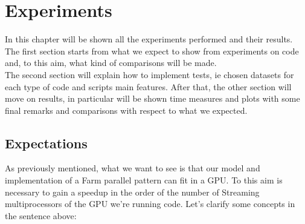 \chapter{Experiments}
\label{chap:experim}
In this chapter will be shown all the experiments performed and their results. The first section starts from what we expect to show from experiments on code and, to this aim, what kind of comparisons will be made.\\
The second section will explain how to implement tests, ie chosen datasets for each type of code and scripts main features.
After that, the other section will move on results, in particular will be shown time measures and plots with some final remarks and comparisons with respect to what we expected.

\section{Expectations}
As previously mentioned, what we want to see is that our model and implementation of a Farm parallel pattern can fit in a GPU.
To this aim is necessary to gain a speedup in the order of the number of Streaming multiprocessors of the GPU we're running code.
Let's clarify some concepts in the sentence above:

